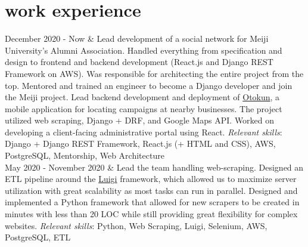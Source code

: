 \documentclass[]{cv-roald}
\begin{document}
\section*{work experience}
\begin{tabularcv}
  December 2020 - Now   & 
                    \newline Lead development of a social network for Meiji University's Alumni Association. Handled everything from specification and design to frontend and backend development (React.js and Django REST Framework on AWS). Was responsible for architecting the entire project from the top.
                    \newline Mentored and trained an engineer to become a Django developer and join the Meiji project.
                    \newline Lead backend development and deployment of \href{https://www.otokun.jp/}{Otokun}, a mobile application for locating campaigns at nearby businesses. The project utilized web scraping, Django + DRF, and Google Maps API. Worked on developing a client-facing administrative portal using React.
                    \newline \textit{Relevant skills}: Django + Django REST Framework, React.js (+ HTML and CSS), AWS, PostgreSQL, Mentorship, Web Architecture
                    \\[\vspacepar]
  May 2020 - November 2020   & 
                    \newline Lead the team handling web-scraping. Designed an ETL pipeline around the \href{https://luigi.readthedocs.io/en/stable/}{Luigi} framework, which allowed us to maximize server utilization with great scalability as most tasks can run in parallel.
                    \newline Designed and implemented a Python framework that allowed for new scrapers to be created in minutes with less than 20 LOC while still providing great flexibility for complex websites.
                    \newline \textit{Relevant skills}: Python, Web Scraping, Luigi, Selenium, AWS, PostgreSQL, ETL

\end{tabularcv}
\end{document}
